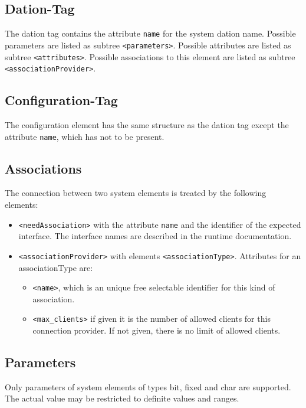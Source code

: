 \subsection{Dation-Tag}
The dation tag contains the attribute \verb|name| for the
system dation name.
Possible parameters are listed as subtree \verb|<parameters>|.
Possible attributes are listed as subtree \verb|<attributes>|.
Possible associations to this element are
 listed as subtree \verb|<associationProvider>|.


\subsection{Configuration-Tag}
The configuration element has the same structure as the dation tag
except the attribute \verb|name|, which has not to be present.

\subsection{Associations}
The connection between two system elements is treated by the following
elements:

\begin{itemize}
\item \verb|<needAssociation>| with the attribute 
 \verb|name| and the identifier of the expected interface. The 
  interface names are described in the runtime documentation. 
\item \verb|<associationProvider>|  with elements \verb|<associationType>|.
  Attributes for an associationType are:
  \begin{itemize}
   \item  \verb|<name>|,  which is an unique free selectable
     identifier for this kind of  association.
   \item \verb|<max_clients>|  if given it is the number of allowed
      clients for this connection provider. If not given, there is no
      limit of allowed clients.
   \end{itemize} 
\end{itemize}

\subsection{Parameters}
Only parameters of system elements of types bit, fixed and char are supported.
The actual value may be restricted to definite values and ranges.

